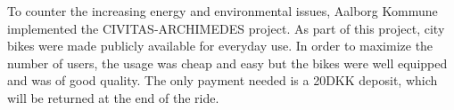To counter the increasing energy and environmental issues, Aalborg Kommune implemented the CIVITAS-ARCHIMEDES project\cite{aalborgbycyklenbagcyklen}. As part of this project, city bikes were made publicly available for everyday use.
In order to maximize the number of users, the usage was cheap and easy but the bikes were well equipped and was of good quality\cite{cykelplanlaegning}. The only payment needed is a 20DKK deposit, which will be returned at the end of the ride.

